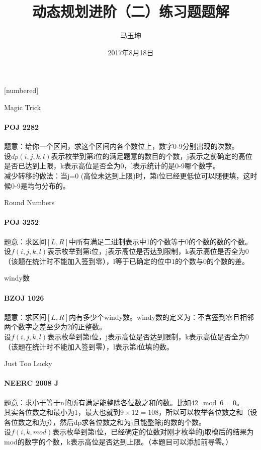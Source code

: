\documentclass[hyperref={unicode=true}]{beamer}
\theoremstyle{definition}
\theoremstyle{proof}
\begin{document}
[numbered]
\renewcommand\figurename{图}
\renewcommand\tablename{表}
\renewcommand\contentsname{\centering 目录}


\title{动态规划进阶（二）练习题题解}
\subtitle{}
\author{马玉坤}
\date{2017年8月18日}

\begin{frame}\titlepage\end{frame}

\begin{frame}{Magic Trick}
  \framesubtitle{POJ 2282}
  题意：给你一个区间，求这个区间内各个数位上，数字0-9分别出现的次数。\\
  设$dp(i,j,k,l)$表示枚举到第i位的满足题意的数目的个数，j表示之前确定的高位是否已达到上限，k表示高位是否全为0，l表示统计的是0-9哪个数字。\\
  减少转移的做法：当j=0 (高位未达到上限)时，第i位已经更低位可以随便填，这时候0-9是均匀分布的。
\end{frame}

\begin{frame}{Round Numbers}
  \framesubtitle{POJ 3252}
  题意：求区间$[L,R]$中所有满足二进制表示中1的个数等于0的个数的数的个数。\\
  设$f(i,j,k,l)$表示枚举到第i位，j表示高位是否达到限制，k表示高位是否全为0（该题在统计时不能加入签到零），l等于已确定的位中1的个数与0的个数的差。
\end{frame}

\begin{frame}{windy数}
  \framesubtitle{BZOJ 1026}
  题意：求区间$[L,R]$内有多少个windy数。windy数的定义为：不含签到零且相邻两个数字之差至少为2的正整数。\\
  设$f(i,j,k,l)$表示枚举到第i位，j表示高位是否达到限制，k表示高位是否全为0（该题在统计时不能加入签到零），l表示第i位填的数。
\end{frame}


\begin{frame}{Just Too Lucky}
  \framesubtitle{NEERC 2008 J}
  题意：求小于等于n的所有满足能整除各位数之和的数。比如$42 \mod 6 = 0$。\\
  其实各位数之和最小为1，最大也就到$9 \times 12 = 108$，所以可以枚举各位数之和（设各位数之和为$j$），然后dp求各位数之和为j且能整除j的数的个数。\\
  设$f (i,k,mod)$表示枚举到第i位，已经确定的位数对刚才枚举的j取模后的结果为mod的数字的个数，k表示高位是否达到上限。（本题目可以添加前导零。）
\end{frame}
\end{document}
